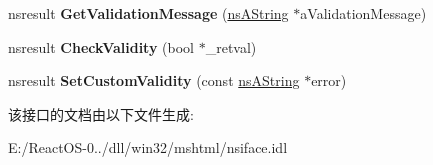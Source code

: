 \begin{DoxyCompactItemize}
nsresult {\bfseries Get\+Validation\+Message} (\hyperlink{structns_string_container}{ns\+A\+String} $\ast$a\+Validation\+Message)
\item 
\mbox{\label{interfacens_i_d_o_m_h_t_m_l_button_element_a0d34d0d7486e7344cc23b33e83ea8034}} 
nsresult {\bfseries Check\+Validity} (bool $\ast$\+\_\+retval)
\item 
\mbox{\label{interfacens_i_d_o_m_h_t_m_l_button_element_addcda3aa4fb3e61684fbd1ff60418b5d}} 
nsresult {\bfseries Set\+Custom\+Validity} (const \hyperlink{structns_string_container}{ns\+A\+String} $\ast$error)
\end{DoxyCompactItemize}


该接口的文档由以下文件生成\+:\begin{DoxyCompactItemize}
\item 
E\+:/\+React\+O\+S-\/0../dll/win32/mshtml/nsiface.\+idl\end{DoxyCompactItemize}
